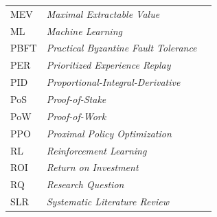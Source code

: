 \begin{longtable}{@{} l >{\raggedright\arraybackslash}p{7.0cm} c @{}}
MEV & \textit{Maximal Extractable Value} & \\
ML & \textit{Machine Learning} & \\
PBFT & \textit{Practical Byzantine Fault Tolerance} & \\
PER & \textit{Prioritized Experience Replay} & \\
PID & \textit{Proportional-Integral-Derivative} & \\
PoS & \textit{Proof-of-Stake} & \\
PoW & \textit{Proof-of-Work} & \\
PPO & \textit{Proximal Policy Optimization} & \\
RL & \textit{Reinforcement Learning} & \\
ROI & \textit{Return on Investment} & \\
RQ & \textit{Research Question} & \\
SLR & \textit{Systematic Literature Review} & \\

\end{longtable}